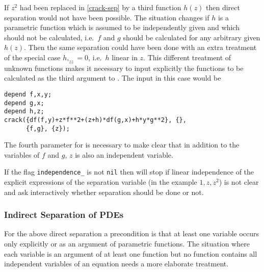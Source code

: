 If $z^2$ had been replaced in \eqref{crack-sep} by a third function
$h(z)$ then direct separation would not have been possible.  The
situation changes if $h$ is a parametric function which is assumed to
be independently given and which should not be calculated, i.e.\ $f$
and $g$ should be calculated for any arbitrary given $h(z)$.  Then the
same separation could have been done with an extra treatment of the
special case $h,_{zz} = 0$, i.e.\ $h$ linear in $z$.  This different
treatment of unknown functions makes it necessary to input explicitly
the functions to be calculated as the third argument to
.  The input in this case would be
\begin{verbatim}
depend f,x,y;
depend g,x;
depend h,z;
crack({df(f,y)+z*f**2+(z+h)*df(g,x)+h*y*g**2}, {},
      {f,g}, {z});
\end{verbatim}
The fourth parameter for  is necessary to make clear
that in addition to the variables of $f$ and $g$, $z$ is also an
independent variable.

If the flag \texttt{independence\_} is not \texttt{nil} then
 will stop if linear independence of the explicit
expressions of the separation variable (in the example $1,z,z^2$) is
not clear and ask interactively whether separation should be done or
not.

\subsubsection{Indirect Separation of PDEs}

For the above direct separation a precondition is that at least one
variable occurs only explicitly or as an argument of parametric
functions.  The situation where each variable is an argument of at least
one function but no function contains all independent variables of an
equation needs a more elaborate treatment.

